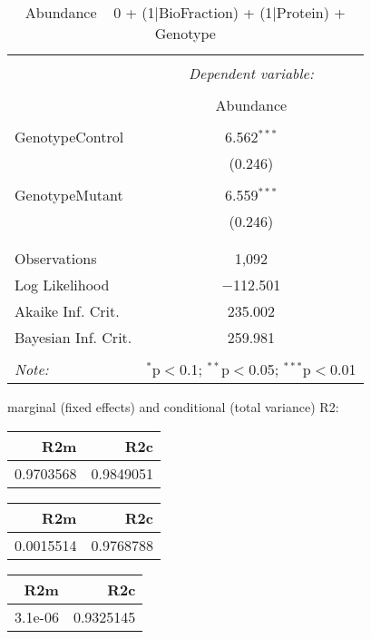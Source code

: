 \documentclass[11pt]{report}
\begin{document}
\begin{table}[!htbp] \centering 
  \caption{Abundance ~ 0 + (1|BioFraction) + (1|Protein) + Genotype} 
  \label{} 
\begin{tabular}{@{\extracolsep{5pt}}lc} 
\\[-1.8ex]\hline 
\hline \\[-1.8ex] 
 & \multicolumn{1}{c}{\textit{Dependent variable:}} \\ 
\cline{2-2} 
\\[-1.8ex] & Abundance \\ 
\hline \\[-1.8ex] 
 GenotypeControl & 6.562$^{***}$ \\ 
  & (0.246) \\ 
  & \\ 
 GenotypeMutant & 6.559$^{***}$ \\ 
  & (0.246) \\ 
  & \\ 
\hline \\[-1.8ex] 
Observations & 1,092 \\ 
Log Likelihood & $-$112.501 \\ 
Akaike Inf. Crit. & 235.002 \\ 
Bayesian Inf. Crit. & 259.981 \\ 
\hline 
\hline \\[-1.8ex] 
\textit{Note:}  & \multicolumn{1}{r}{$^{*}$p$<$0.1; $^{**}$p$<$0.05; $^{***}$p$<$0.01} \\ 
\end{tabular} 
\end{table} 
marginal (fixed effects) and conditional (total variance) R2:

\begin{tabular}{r|r}
\hline
R2m & R2c\\
\hline
0.9703568 & 0.9849051\\
\hline
\end{tabular}

\begin{tabular}{r|r}
\hline
R2m & R2c\\
\hline
0.0015514 & 0.9768788\\
\hline
\end{tabular}

\begin{tabular}{r|r}
\hline
R2m & R2c\\
\hline
3.1e-06 & 0.9325145\\
\hline
\end{tabular}
\end{document}

